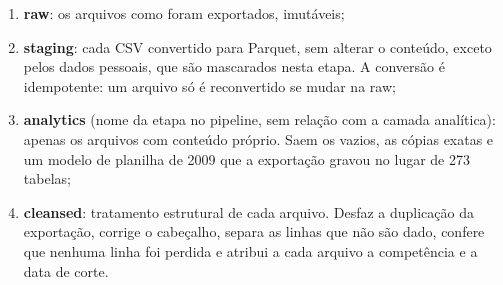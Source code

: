 \begin{enumerate}
	\item \textbf{raw}: os arquivos como foram exportados, imutáveis;
	\item \textbf{staging}: cada CSV convertido para Parquet, sem alterar o conteúdo, exceto pelos dados pessoais, que são mascarados nesta etapa. A conversão é idempotente: um arquivo só é reconvertido se mudar na raw;
	\item \textbf{analytics} (nome da etapa no pipeline, sem relação com a camada analítica): apenas os arquivos com conteúdo próprio. Saem os vazios, as cópias exatas e um modelo de planilha de 2009 que a exportação gravou no lugar de 273 tabelas;
	\item \textbf{cleansed}: tratamento estrutural de cada arquivo. Desfaz a duplicação da exportação, corrige o cabeçalho, separa as linhas que não são dado, confere que nenhuma linha foi perdida e atribui a cada arquivo a competência e a data de corte.
\end{enumerate}

